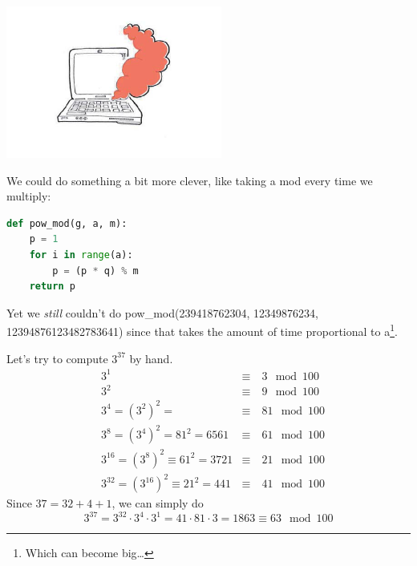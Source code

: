 \begin{center}
    \includegraphics[height=5cm]{images/broken_laptop.png}
\end{center}

We could do something a bit more clever, like taking a mod every time we multiply:
\begin{lstlisting}[language=Python]
def pow_mod(g, a, m): 
    p = 1
    for i in range(a): 
        p = (p * q) % m
    return p
\end{lstlisting}

Yet we \emph{still} couldn't do \textsf{pow\_mod(239418762304, 12349876234, 12394876123482783641)} since that takes the amount of time proportional to \textsf{a}\footnote{Which can become big\dots}.

\begin{example}
    Let's try to compute $3^{37}$ by hand.
    \begin{align*}
         & 3^1                                   & \equiv & \ 3  \mod{100} \\
         & 3^2                                   & \equiv & \ 9  \mod{100} \\
         & 3^4 = (3^2)^2 =                       & \equiv & \ 81 \mod{100} \\
         & 3^8 = (3^4)^2 = 81^2 = 6561           & \equiv & \ 61 \mod{100} \\
         & 3^{16} = (3^8)^2 \equiv 61^2 = 3721   & \equiv & \ 21 \mod{100} \\
         & 3^{32} = (3^{16})^2 \equiv 21^2 = 441 & \equiv & \ 41 \mod{100}
    \end{align*}
    Since $37 = 32 + 4 + 1$, we can simply do
    \[3^{37} = 3^{32} \cdot 3^{4} \cdot 3^{1} = 41\cdot 81\cdot 3=1863\equiv 63 \mod{100}\]
\end{example}